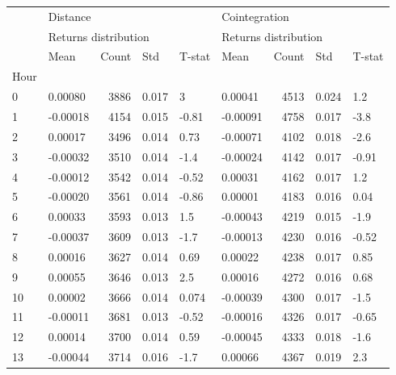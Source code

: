 \begin{tabular}{llrlllrll}
\toprule
{} & \multicolumn{4}{l}{Distance} & \multicolumn{4}{l}{Cointegration} \\
{} & \multicolumn{4}{l}{Returns distribution} & \multicolumn{4}{l}{Returns distribution} \\
{} &                 Mean & Count &    Std & T-stat &                 Mean & Count &    Std & T-stat \\
Hour &                      &       &        &        &                      &       &        &        \\
\midrule
0    &              0.00080 &  3886 &  0.017 &      3 &              0.00041 &  4513 &  0.024 &    1.2 \\
1    &             -0.00018 &  4154 &  0.015 &  -0.81 &             -0.00091 &  4758 &  0.017 &   -3.8 \\
2    &              0.00017 &  3496 &  0.014 &   0.73 &             -0.00071 &  4102 &  0.018 &   -2.6 \\
3    &             -0.00032 &  3510 &  0.014 &   -1.4 &             -0.00024 &  4142 &  0.017 &  -0.91 \\
4    &             -0.00012 &  3542 &  0.014 &  -0.52 &              0.00031 &  4162 &  0.017 &    1.2 \\
5    &             -0.00020 &  3561 &  0.014 &  -0.86 &              0.00001 &  4183 &  0.016 &   0.04 \\
6    &              0.00033 &  3593 &  0.013 &    1.5 &             -0.00043 &  4219 &  0.015 &   -1.9 \\
7    &             -0.00037 &  3609 &  0.013 &   -1.7 &             -0.00013 &  4230 &  0.016 &  -0.52 \\
8    &              0.00016 &  3627 &  0.014 &   0.69 &              0.00022 &  4238 &  0.017 &   0.85 \\
9    &              0.00055 &  3646 &  0.013 &    2.5 &              0.00016 &  4272 &  0.016 &   0.68 \\
10   &              0.00002 &  3666 &  0.014 &  0.074 &             -0.00039 &  4300 &  0.017 &   -1.5 \\
11   &             -0.00011 &  3681 &  0.013 &  -0.52 &             -0.00016 &  4326 &  0.017 &  -0.65 \\
12   &              0.00014 &  3700 &  0.014 &   0.59 &             -0.00045 &  4333 &  0.018 &   -1.6 \\
13   &             -0.00044 &  3714 &  0.016 &   -1.7 &              0.00066 &  4367 &  0.019 &    2.3 \\

\end{tabular}
